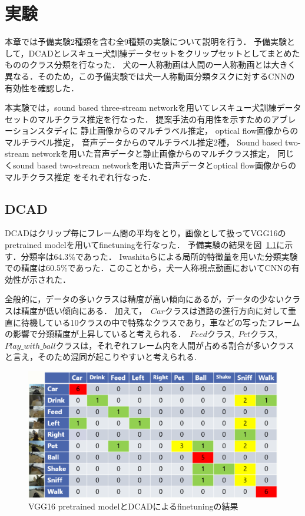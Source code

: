 \chapter{実験}
本章では予備実験2種類を含む全9種類の実験について説明を行う．
予備実験として，DCADとレスキュー犬訓練データセットをクリップセットとしてまとめたもののクラス分類を行なった．
犬の一人称動画は人間の一人称動画とは大きく異なる．そのため，この予備実験では犬一人称動画分類タスクに対するCNNの有効性を確認した．

本実験では，sound based three-stream networkを用いてレスキュー犬訓練データセットのマルチクラス推定を行なった．
提案手法の有用性を示すためのアブレーションスタディに
静止画像からのマルチラベル推定，
optical flow画像からのマルチラベル推定，
音声データからのマルチラベル推定2種，
Sound based two-stream networkを用いた音声データと静止画像からのマルチクラス推定，
同じくsound based two-stream networkを用いた音声データとoptical flow画像からのマルチクラス推定
をそれぞれ行なった．
\section{DCAD}
DCADはクリップ毎にフレーム間の平均をとり，画像として扱ってVGG16のpretrained modelを用いてfinetuningを行なった．
予備実験の結果を図~\ref{vgg16_res}に示す．分類率は64.3\%であった．
Iwashitaらによる局所的特徴量を用いた分類実験での精度は60.5\%であった．このことから，犬一人称視点動画においてCNNの有効性が示された．

全般的に，データの多いクラスは精度が高い傾向にあるが，データの少ないクラスは精度が低い傾向にある．
加えて，~\(Car\)クラスは道路の進行方向に対して垂直に待機している10クラスの中で特殊なクラスであり，車などの写ったフレームの影響で分類精度が上昇していると考えられる．~\(Feed\)クラス,~\(Pet\)クラス,~\(Play\_with\_ball\)クラスは，それぞれフレーム内を人間が占める割合が多いクラスと言え，そのため混同が起こりやすいと考えられる.

\begin{figure}[H]
   \begin{center}

    \includegraphics[scale=0.5]{./Figures/vgg16_res.eps}
    \caption{VGG16 pretrained modelとDCADによるfinetuningの結果}
    \label{vgg16_res}
   \end{center}
\end{figure}

